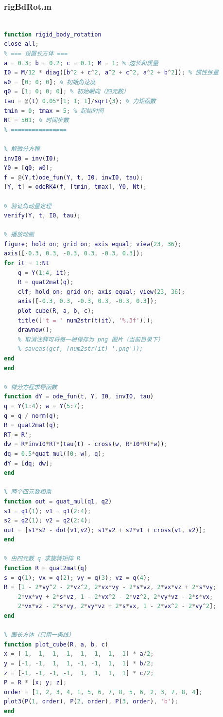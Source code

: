 \subsubsection{rigBdRot.m}
\begin{lstlisting}[language=matlab]
% 刚体绕固定点转动的数值计算

function rigid_body_rotation
close all;
% === 设置长方体 ===
a = 0.3; b = 0.2; c = 0.1; M = 1; % 边长和质量
I0 = M/12 * diag([b^2 + c^2, a^2 + c^2, a^2 + b^2]); % 惯性张量
w0 = [0; 0; 0]; % 初始角速度
q0 = [1; 0; 0; 0]; % 初始朝向（四元数）
tau = @(t) 0.05*[1; 1; 1]/sqrt(3); % 力矩函数
tmin = 0; tmax = 5; % 起始时间
Nt = 501; % 时间步数
% ================

% 解微分方程
invI0 = inv(I0);
Y0 = [q0; w0];
f = @(Y,t)ode_fun(Y, t, I0, invI0, tau);
[Y, t] = odeRK4(f, [tmin, tmax], Y0, Nt);

% 验证角动量定理
verify(Y, t, I0, tau);

% 播放动画
figure; hold on; grid on; axis equal; view(23, 36);
axis([-0.3, 0.3, -0.3, 0.3, -0.3, 0.3]);
for it = 1:Nt
    q = Y(1:4, it);
    R = quat2mat(q);
    clf; hold on; grid on; axis equal; view(23, 36);
    axis([-0.3, 0.3, -0.3, 0.3, -0.3, 0.3]);
    plot_cube(R, a, b, c);
    title(['t = ' num2str(t(it), '%.3f')]);
    drawnow();
    % 取消注释可将每一帧保存为 png 图片（当前目录下）
    % saveas(gcf, [num2str(it) '.png']);
end
end

% 微分方程求导函数
function dY = ode_fun(t, Y, I0, invI0, tau)
q = Y(1:4); w = Y(5:7);
q = q / norm(q);
R = quat2mat(q);
RT = R';
dw = R*invI0*RT*(tau(t) - cross(w, R*I0*RT*w));
dq = 0.5*quat_mul([0; w], q);
dY = [dq; dw];
end

% 两个四元数相乘
function out = quat_mul(q1, q2)
s1 = q1(1); v1 = q1(2:4);
s2 = q2(1); v2 = q2(2:4);
out = [s1*s2 - dot(v1,v2); s1*v2 + s2*v1 + cross(v1, v2)];
end

% 由四元数 q 求旋转矩阵 R
function R = quat2mat(q)
s = q(1); vx = q(2); vy = q(3); vz = q(4);
R = [1 - 2*vy^2 - 2*vz^2, 2*vx*vy - 2*s*vz, 2*vx*vz + 2*s*vy;
    2*vx*vy + 2*s*vz, 1 - 2*vx^2 - 2*vz^2, 2*vy*vz - 2*s*vx;
    2*vx*vz - 2*s*vy, 2*vy*vz + 2*s*vx, 1 - 2*vx^2 - 2*vy^2];
end

% 画长方体（只用一条线）
function plot_cube(R, a, b, c)
x = [-1,  1,  1, -1, -1,  1,  1, -1] * a/2;
y = [-1, -1,  1,  1, -1, -1,  1,  1] * b/2;
z = [-1, -1, -1, -1,  1,  1,  1,  1] * c/2;
P = R * [x; y; z];
order = [1, 2, 3, 4, 1, 5, 6, 7, 8, 5, 6, 2, 3, 7, 8, 4];
plot3(P(1, order), P(2, order), P(3, order), 'b');
end


\end{lstlisting}
